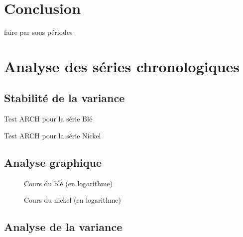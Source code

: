 \documentclass[12pt,a4paper]{article}
\begin{document}
\section*{Conclusion}


faire par sous périodes


\appendix
\renewcommand{\thetable}{\thesection.\arabic{table}}
\renewcommand{\thefigure}{\thesection.\arabic{figure}}
\section{Analyse des séries chronologiques}
\setcounter{table}{0}
\setcounter{figure}{0}
\subsection{Stabilité de la variance}\label{appendix:hetero}
\begin{table}[H]
    \centering
    \caption{Test ARCH pour la série Blé}
    \sffamily
    \label{tab:hetero_ble}
    
\end{table}

\begin{table}[H]
    \centering
    \caption{Test ARCH pour la série Nickel}
    \sffamily
    \label{tab:hetero_nickel}
    
\end{table}

\subsection{Analyse graphique}\label{appendix:loggraph}
\begin{figure}[H]
    \centering
    \label{fig:ble_log}
    \resizebox{0.8\textwidth}{!}{}
    \caption{Cours du blé (en logarithme)}
\end{figure}
\begin{figure}[H]
    \centering
    \label{fig:nickel_log}
    \resizebox{0.8\textwidth}{!}{}
    \caption{Cours du nickel (en logarithme)}
\end{figure}
\subsection{Analyse de la variance}
\end{document}
